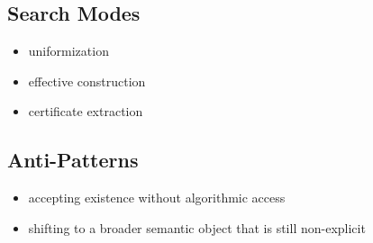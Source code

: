 \documentclass[11pt]{article}
\begin{document}
\subsection*{Search Modes}
\begin{itemize}[leftmargin=*,itemsep=0.2em]
\item uniformization
\item effective construction
\item certificate extraction
\end{itemize}
\subsection*{Anti-Patterns}
\begin{itemize}[leftmargin=*,itemsep=0.2em]
\item accepting existence without algorithmic access
\item shifting to a broader semantic object that is still non-explicit
\end{itemize}
\end{document}
